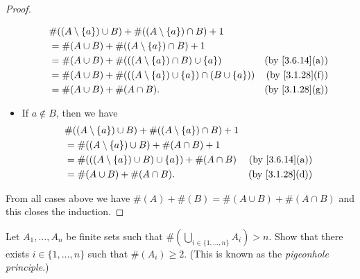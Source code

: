 \begin{proof}
\begin{itemize}
\begin{align*}
             & \#((A \setminus \{a\}) \cup B) + \#((A \setminus \{a\}) \cap B) + 1                                      \\
             & = \#(A \cup B) + \#((A \setminus \{a\}) \cap B) + 1                                                      \\
             & = \#(A \cup B) + \#(((A \setminus \{a\}) \cap B) \cup \{a\})              & \text{(by \cref{3.6.14}(a))} \\
             & = \#(A \cup B) + \#(((A \setminus \{a\}) \cup \{a\}) \cap (B \cup \{a\})) & \text{(by \cref{3.1.28}(f))} \\
             & = \#(A \cup B) + \#(A \cap B).                                            & \text{(by \cref{3.1.28}(g))}
          \end{align*}
    \item If \(a \notin B\), then we have
          \begin{align*}
             & \#((A \setminus \{a\}) \cup B) + \#((A \setminus \{a\}) \cap B) + 1                                \\
             & = \#((A \setminus \{a\}) \cup B) + \#(A \cap B) + 1                                                \\
             & = \#(((A \setminus \{a\}) \cup B) \cup \{a\}) + \#(A \cap B)        & \text{(by \cref{3.6.14}(a))} \\
             & = \#(A \cup B) + \#(A \cap B).                                      & \text{(by \cref{3.1.28}(d))}
          \end{align*}
  \end{itemize}
  From all cases above we have \(\#(A) + \#(B) = \#(A \cup B) + \#(A \cap B)\) and this closes the induction.
\end{proof}

\begin{exercise}\label{ex 3.6.10}
  Let \(A_1, \dots, A_n\) be finite sets such that \(\#(\bigcup_{i \in \{1, \dots, n\}} A_i) > n\).
  Show that there exists \(i \in \{1, \dots, n\}\) such that \(\#(A_i) \geq 2\).
  (This is known as the \emph{pigeonhole principle}.)
\end{exercise}

